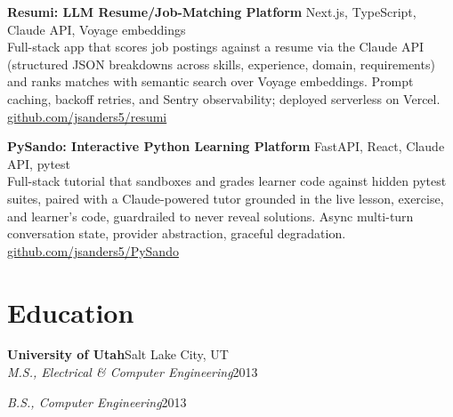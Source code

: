 \documentclass[10.5pt, letterpaper]{article}
\newcommand{\jobentry}[4]{%
  \noindent
  \textbf{\color{accent}#1}\hfill\textcolor{muted}{\small #2}\\
  \textit{#3}\hfill\textcolor{muted}{\small #4}%
}
\newcommand{\jobrole}[2]{%
  \noindent\textit{#1}\hfill\textcolor{muted}{\small #2}%
}
\begin{document}
\noindent\textbf{Resumi: LLM Resume/Job-Matching Platform}
\hfill\textcolor{muted}{\small Next.js, TypeScript, Claude API, Voyage embeddings}\\
Full-stack app that scores job postings against a resume via the Claude API
(structured JSON breakdowns across skills, experience, domain, requirements) and
ranks matches with semantic search over Voyage embeddings. Prompt caching,
backoff retries, and Sentry observability; deployed serverless on Vercel.
\hfill\textcolor{muted}{\small\href{https://github.com/jsanders5/resumi}{github.com/jsanders5/resumi}}

\vspace{5pt}

\noindent\textbf{PySando: Interactive Python Learning Platform}
\hfill\textcolor{muted}{\small FastAPI, React, Claude API, pytest}\\
Full-stack tutorial that sandboxes and grades learner code against hidden pytest
suites, paired with a Claude-powered tutor grounded in the live lesson, exercise,
and learner's code, guardrailed to never reveal solutions. Async multi-turn
conversation state, provider abstraction, graceful degradation.
\hfill\textcolor{muted}{\small\href{https://github.com/jsanders5/PySando}{github.com/jsanders5/PySando}}

\section{Education}

\jobentry{University of Utah}{Salt Lake City, UT}%
  {M.S., Electrical \& Computer Engineering}{2013}

\vspace{4pt}
\jobrole{B.S., Computer Engineering}{2013}
\end{document}

